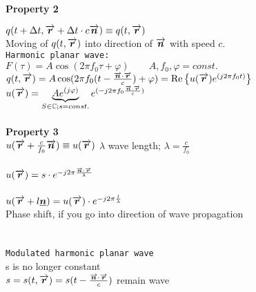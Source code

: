 \textbf{Property 2}\\
\begin{doublespace}
$q(t+\Delta t, \vecp{r} + \Delta t\cdot c \vecp{n}) \equiv q(t,\vecp{r})$\\
Moving of $q(t,\vecp{r})$ into direction of $\vecp{n}$ with speed $c$.\\

\texttt{Harmonic planar wave:}\\
$F(\tau)= A \cos(2\pi f_0\tau +\varphi ) \qquad A, f_0, \varphi = const.$\\ 
$q(t,\vecp{r})= A \cos(2\pi f_0(t-\frac{\vecp{n}\cdot\vecp{r}}{c})+\varphi) = \Re{u(\vecp{r})e^{(j2\pi f_0t)}}$\\
$u(\vecp{r})= \underbrace{A e^{(j\varphi)}}_{S \in \mathbb{C}; s = const.} e^{(-j2\pi f_0 \frac{\vecp{n}\cdot\vecp{r}}{c})}$\\ \ \\
\textbf{Property 3}\\
$u(\vecp{r}+ \frac{c}{f_0}\vecp{n})\equiv u(\vecp{r})$ \qquad $\lambda$ wave length; $\lambda =\frac{c}{f_0} $\\ \ \\
$u(\vecp{r}) = s\cdot  e^{-j2\pi \frac{\vecp{n}\cdot\vecp{r}}{\lambda}}$\\ \ \\


$u(\vecp{r}+ l\vec{n})= u(\vecp{r})\cdot e^{-j2\pi \frac{l}{\lambda}}$\\
Phase shift, if you go into direction of wave propagation\\ \ \\ \ \\
\texttt{Modulated harmonic planar wave}\\
s is no longer constant\\
$s= s(t,\vecp{r})= s(t-\frac{\vecp{n}\cdot\vecp{r}}{c})$ \qquad remain wave \\
\end{doublespace}
\\ \ \\

